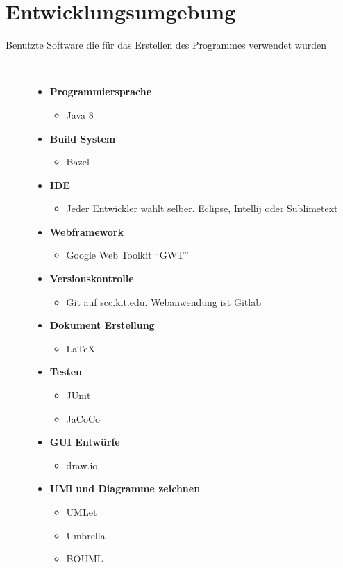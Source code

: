 \documentclass[parskip=full,11pt,twoside]{scrartcl}
\begin{document}
\section{Entwicklungsumgebung}
  \begin{description}
	\item[Benutzte Software die für das Erstellen des Programmes verwendet wurden]~\par
	\begin{itemize}
		\item \textbf{Programmiersprache}
		\begin{itemize}
			\item Java 8
		\end{itemize}
		\item \textbf{Build System}
		\begin{itemize}
			\item Bazel
		\end{itemize}
		\item \textbf{IDE}
		\begin{itemize}
			\item Jeder Entwickler wählt selber. Eclipse, Intellij oder Sublimetext
		\end{itemize}
		\item \textbf{Webframework}
		\begin{itemize}
			\item Google Web Toolkit \enquote{GWT}
		\end{itemize}
		\item \textbf{Versionskontrolle}
		\begin{itemize}
			\item Git auf scc.kit.edu. Webanwendung ist Gitlab
		\end{itemize}
		\item \textbf{Dokument Erstellung}
		\begin{itemize}
			\item LaTeX
		\end{itemize}
		\item \textbf{Testen}
		\begin{itemize}
			\item JUnit
			\item JaCoCo
		\end{itemize}
		\item \textbf{GUI Entwürfe}
			\begin{itemize}
				\item draw.io
			\end{itemize}
		\item \textbf{UMl und Diagramme zeichnen}
			\begin{itemize}
				\item UMLet
				\item Umbrella
				\item BOUML
				

\end{itemize}
\end{itemize}
\end{description}
\end{document}
